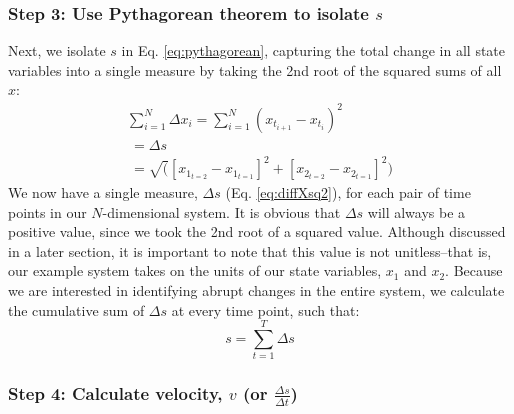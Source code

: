 \documentclass[12pt,twoside,openany]{reedthesis}
\begin{document}
\subsubsection{\texorpdfstring{Step 3: Use Pythagorean theorem to
isolate
\(s\)}{Step 3: Use Pythagorean theorem to isolate s}}\label{step-3-use-pythagorean-theorem-to-isolate-s}

Next, we isolate \(s\) in Eq. \eqref{eq:pythagorean}, capturing the total
change in all state variables into a single measure by taking the 2nd
root of the squared sums of all \(x\):
\begin{equation}
\begin{array}{rcr}
\sum_{i=1}^{N} \Delta {x_i} = \sum_{i=1}^{N}(x_{t_{i+1}} - x_{t_i})^2 \\ 
\ = \Delta s \\ 
\ = \sqrt([x_{1_{t=2}} - x_{1_{t=1}}]^2 + [x_{2_{t=2}} - x_{2_{t=1}}]^2)
\end{array}
\label{eq:diffXsq2}
\end{equation}
We now have a single measure, \(\Delta s\) (Eq. \eqref{eq:diffXsq2}), for
each pair of time points in our \(N\)-dimensional system. It is obvious
that \(\Delta s\) will always be a positive value, since we took the 2nd
root of a squared value. Although discussed in a later section, it is
important to note that this value is not unitless--that is, our example
system takes on the units of our state variables, \(x_1\) and \(x_2\).
Because we are interested in identifying abrupt changes in the entire
system, we calculate the cumulative sum of \(\Delta s\) at every time
point, such that:
\begin{equation}
s = \sum_{t=1}^T \Delta s
\label{eq:s}
\end{equation}
\subsubsection{\texorpdfstring{Step 4: Calculate velocity, \(v\) (or
\(\frac {\Delta s}{\Delta t}\))}{Step 4: Calculate velocity, v (or \textbackslash{}frac \{\textbackslash{}Delta s\}\{\textbackslash{}Delta t\})}}\label{step-4-calculate-velocity-v-or-frac-delta-sdelta-t}
\end{document}
